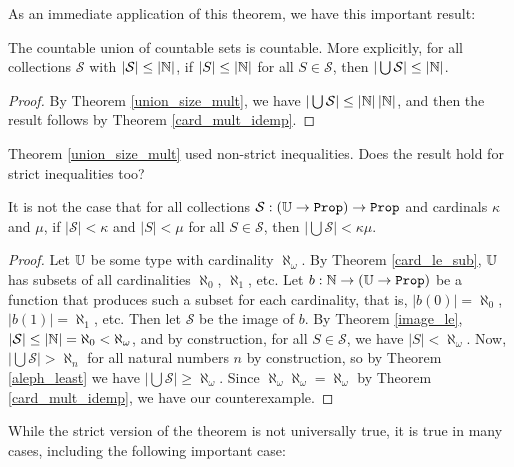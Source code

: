 \documentclass[../../math.tex]{subfiles}
\begin{document}
As an immediate application of this theorem, we have this important result:

\begin{theorem} \label{countable_union_countable}
    The countable union of countable sets is countable.  More explicitly, for
    all collections $\mathcal S$ with $|\mathcal S| \leq |\mathbb{N}|$, if $|S| \leq
    |\mathbb{N}|$ for all $S \in \mathcal S$, then $|\bigcup \mathcal S| \leq |\mathbb{N}|$.
\end{theorem}
\begin{proof}
    By Theorem \ref{union_size_mult}, we have $|\bigcup \mathcal S| \leq
    |\mathbb{N}|\,|\mathbb{N}|$, and then the result follows by Theorem \ref{card_mult_idemp}.
\end{proof}

Theorem \ref{union_size_mult} used non-strict inequalities.  Does the result
hold for strict inequalities too?

\begin{theorem}
    It is not the case that for all collections $\mathcal S : (\U \to \Prop) \to
    \Prop$ and cardinals $\kappa$ and $\mu$, if $|\mathcal S| < \kappa$ and $|S|
    < \mu$ for all $S \in \mathcal S$, then $|\bigcup \mathcal S| < \kappa\mu$.
\end{theorem}
\begin{proof}
    Let $\mathbb{U}$ be some type with cardinality $\aleph_\omega$.  By Theorem
    \ref{card_le_sub}, $\mathbb{U}$ has subsets of all cardinalities $\aleph_0$,
    $\aleph_1$, etc.  Let $b : \N \to (\U \to \Prop)$ be a function that
    produces such a subset for each cardinality, that is, $|b(0)| = \aleph_0$,
    $|b(1)| = \aleph_1$, etc.  Then let $\mathcal S$ be the image of $b$.  By
    Theorem \ref{image_le}, $|\mathcal S| \leq |\mathbb{N}| = \aleph_0 < \aleph_\omega$,
    and by construction, for all $S \in \mathcal S$, we have $|S| <
    \aleph_\omega$.  Now, $|\bigcup \mathcal S| > \aleph_n$ for all natural
    numbers $n$ by construction, so by Theorem \ref{aleph_least} we have
    $|\bigcup \mathcal S| \geq \aleph_\omega$.  Since $\aleph_\omega
    \aleph_\omega = \aleph_\omega$ by Theorem \ref{card_mult_idemp}, we have our
    counterexample.
\end{proof}

While the strict version of the theorem is not universally true, it is true in
many cases, including the following important case:
\end{document}
